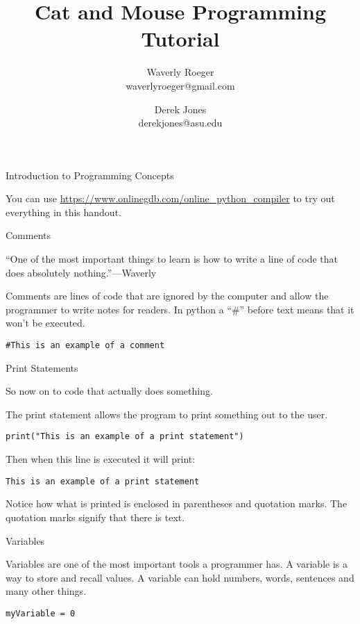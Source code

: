 \documentclass[12pt,oneside]{article}
\newcommand{\q}[1]{``#1''}
\newcommand{\subsectitle}[1]{
  \begin{flushleft}{\large#1}\end{flushleft}
}
\newcommand{\sectitlenonewpage}[1]{
  \begin{flushleft}{\Large#1}\end{flushleft}
}
\begin{document}
\title{\Huge Cat and Mouse Programming Tutorial}
\author{Waverly Roeger\\\normalsize waverlyroeger@gmail.com \and Derek Jones\\\normalsize derekjones@asu.edu}
\date{}

\maketitle

\sectitlenonewpage{Introduction to Programming Concepts}

You can use \url{https://www.onlinegdb.com/online_python_compiler} to try out everything in this handout.

\subsectitle{Comments}

\q{One of the most important things to learn is how to write a line of code that does absolutely nothing.}---Waverly

Comments are lines of code that are ignored by the computer and allow the programmer to write notes for readers. In python a \q{\#} before text means that it won't be executed.

\begin{lstlisting}
#This is an example of a comment
\end{lstlisting}

\subsectitle{Print Statements}

So now on to code that actually does something. 

The print statement allows the program to print something out to the user.

\begin{lstlisting}
print("This is an example of a print statement")
\end{lstlisting}

Then when this line is executed it will print:

\begin{lstlisting}
This is an example of a print statement
\end{lstlisting}

Notice how what is printed is enclosed in parentheses and quotation marks. The quotation marks signify that there is text. 

\subsectitle{Variables}

Variables are one of the most important tools a programmer has. A variable is a way to store and recall values. A variable can hold numbers, words, sentences and many other things. 


\begin{lstlisting}
myVariable = 0
\end{lstlisting}
\end{document}
